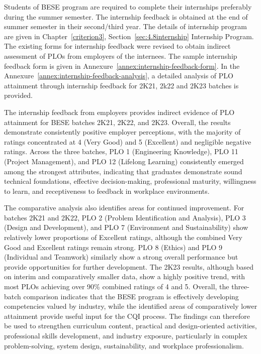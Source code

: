 Students of BESE program are required to complete their internships preferably during the summer semester. The internship feedback is obtained at the end of summer semester in their second/third year. The details of internship program are given in Chapter~\ref{criterion3}, Section~\ref{sec:4.8internship} Internship Program. The existing forms for internship feedback were revised to obtain indirect assessment of PLOs from employers of the internees. The sample internship feedback form is given in Annexure~\ref{annex:internship-feedback-form}. In the Annexure~\ref{annex:internship-feedback-analysis}, a detailed analysis of PLO attainment through internship feedback for 2K21, 2k22 and 2K23 batches is provided.

The internship feedback from employers provides indirect evidence of PLO attainment for BESE batches 2K21, 2K22, and 2K23. Overall, the results demonstrate consistently positive employer perceptions, with the majority of ratings concentrated at 4 (Very Good) and 5 (Excellent) and negligible negative ratings. Across the three batches, PLO 1 (Engineering Knowledge), PLO 11 (Project Management), and PLO 12 (Lifelong Learning) consistently emerged among the strongest attributes, indicating that graduates demonstrate sound technical foundations, effective decision-making, professional maturity, willingness to learn, and receptiveness to feedback in workplace environments.

The comparative analysis also identifies areas for continued improvement. For batches 2K21 and 2K22, PLO 2 (Problem Identification and Analysis), PLO 3 (Design and Development), and PLO 7 (Environment and Sustainability) show relatively lower proportions of Excellent ratings, although the combined Very Good and Excellent ratings remain strong. PLO 8 (Ethics) and PLO 9 (Individual and Teamwork) similarly show a strong overall performance but provide opportunities for further development. The 2K23 results, although based on interim and comparatively smaller data, show a highly positive trend, with most PLOs achieving over 90\% combined ratings of 4 and 5. Overall, the three-batch comparison indicates that the BESE program is effectively developing competencies valued by industry, while the identified areas of comparatively lower attainment provide useful input for the CQI process. The findings can therefore be used to strengthen curriculum content, practical and design-oriented activities, professional skills development, and industry exposure, particularly in complex problem-solving, system design, sustainability, and workplace professionalism.

